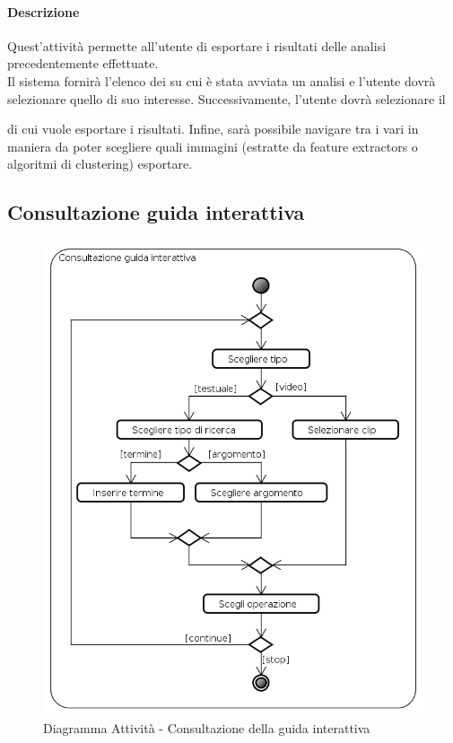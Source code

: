 \paragraph{Descrizione\\}
Quest'attività permette all'utente di esportare i risultati delle analisi precedentemente effettuate.
\\Il sistema fornirà l'elenco dei \dataset{} su cui è stata avviata un analisi e l'utente dovrà selezionare quello di suo interesse. Successivamente, l'utente dovrà selezionare il \subject{} di cui vuole esportare i risultati. Infine, sarà possibile navigare tra i vari \protocol{} in maniera da poter scegliere quali immagini (estratte da feature extractors\glossario{} o algoritmi di clustering) esportare. 
\pagebreak

\subsection{Consultazione guida interattiva}
\label{guide}
\begin{figure}[!h]
	\centering
	\includegraphics[scale=0.6]{./img/Diagrammi_Attivita/Consultazione_guida_interattiva}
	\caption{Diagramma Attività - Consultazione della guida interattiva}
	\label{openG}
\end{figure}
